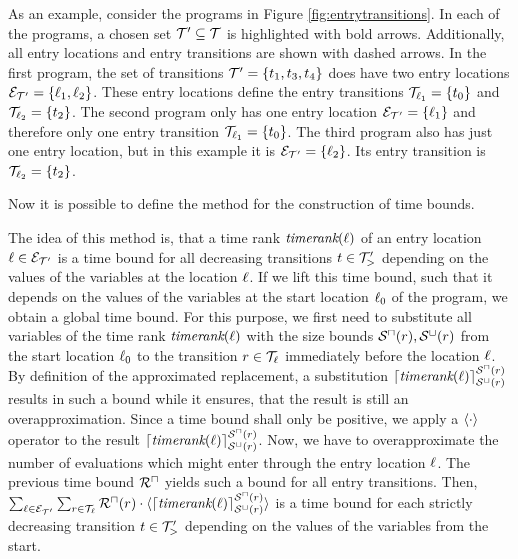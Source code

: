\begin{example}
  
  As an example, consider the programs in Figure \ref{fig:entrytransitions}.
  In each of the programs, a chosen set $\mathcal{T}' \subseteq \mathcal{T}$ is highlighted with bold arrows.
  Additionally, all entry locations and entry transitions are shown with dashed arrows.
  In the first program, the set of transitions $\mathcal{T}' = \lbrace t_1, t_3, t_4 \rbrace$ does have two entry locations $\mathcal{E}_{\mathcal{T}'} = \lbrace \ell_1, \ell_2 \rbrace$.
  These entry locations define the entry transitions $\mathcal{T}_{\ell_1} = \lbrace t_0 \rbrace$ and $\mathcal{T}_{\ell_2} = \lbrace t_2 \rbrace$.
  The second program only has one entry location $\mathcal{E}_{\mathcal{T}'} = \lbrace \ell_1 \rbrace$ and therefore only one entry transition $\mathcal{T}_{\ell_1} = \lbrace t_0 \rbrace$.
  The third program also has just one entry location, but in this example it is $\mathcal{E}_{\mathcal{T}'} = \lbrace \ell_2 \rbrace$.
  Its entry transition is $\mathcal{T}_{\ell_2} = \lbrace t_2 \rbrace$.
\end{example}

Now it is possible to define the method for the construction of time bounds.



The idea of this method is, that a time rank $\emph{timerank}(\ell)$ of an entry location $\ell \in \mathcal{E}_{\mathcal{T}'}$ is a time bound for all decreasing transitions $t \in \mathcal{T}'_>$ depending on the values of the variables at the location $\ell$.
If we lift this time bound, such that it depends on the values of the variables at the start location $\ell_0$ of the program, we obtain a global time bound.
For this purpose, we first need to substitute all variables of the time rank $\emph{timerank}(\ell)$ with the size bounds ${\mathcal{S}^\sqcap}(r), {\mathcal{S}^\sqcup}(r)$ from the start location $\ell_0$ to the transition $r \in \mathcal{T}_{\ell}$ immediately before the location $\ell$.
By definition of the approximated replacement, a substitution $\lceil \emph{timerank}(\ell) \rceil^{{\mathcal{S}^\sqcap}(r)}_{{\mathcal{S}^\sqcup}(r)}$ results in such a bound while it ensures, that the result is still an overapproximation. 
Since a time bound shall only be positive, we apply a $\langle\cdot\rangle$ operator to the result $\lceil \emph{timerank}(\ell) \rceil^{{\mathcal{S}^\sqcap}(r)}_{{\mathcal{S}^\sqcup}(r)}$.
Now, we have to overapproximate the number of evaluations which might enter through the entry location $\ell$.
The previous time bound ${\mathcal{R}^\sqcap}$ yields such a bound for all entry transitions.
Then, $\sum_{\ell \in \mathcal{E}_{\mathcal{T}'}} \sum_{r \in \mathcal{T}_\ell} {\mathcal{R}^\sqcap}(r) \cdot \langle\lceil \emph{timerank}(\ell) \rceil^{{\mathcal{S}^\sqcap}(r)}_{{\mathcal{S}^\sqcup}(r)}\rangle$ is a time bound for each strictly decreasing transition $t \in \mathcal{T}'_>$ depending on the values of the variables from the start.

